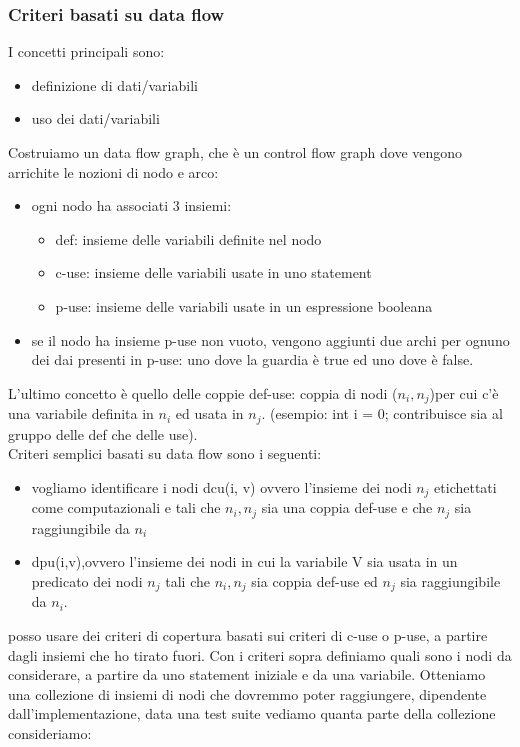 \documentclass{article}
\begin{document}
\subsubsection{Criteri basati su data flow}
I concetti principali sono:
\begin{itemize}
\item definizione di dati/variabili
\item uso dei dati/variabili
\end{itemize}
Costruiamo un data flow graph, che è un control flow graph dove vengono arrichite le nozioni di nodo e arco:
\begin{itemize}
\item ogni nodo ha associati 3 insiemi: 
\begin{itemize}
\item def: insieme delle variabili definite nel nodo
\item c-use: insieme delle variabili usate in uno statement
\item p-use: insieme delle variabili usate in un espressione booleana 
\end{itemize}
\item se il nodo ha insieme p-use non vuoto, vengono aggiunti due archi per ognuno dei dai presenti in p-use: uno dove la guardia è true ed uno dove è false.
\end{itemize}
L'ultimo concetto è quello delle coppie def-use: coppia di nodi ($n_i, n_j$)per cui c'è una variabile definita in $n_i$ ed usata in $n_j$. (esempio: int i = 0; contribuisce sia al gruppo delle def che delle use).\\ Criteri semplici basati su data flow sono i seguenti:
\begin{itemize}
\item vogliamo identificare i nodi dcu(i, v) ovvero l'insieme dei nodi $n_j$ etichettati come computazionali e tali che $n_i, n_j$ sia una coppia def-use e che $n_j$ sia raggiungibile da $n_i$
\item dpu(i,v),ovvero l'insieme dei nodi in cui la variabile V sia usata in un predicato dei nodi $n_j$ tali che $n_i, n_j$ sia coppia def-use ed $n_j$ sia raggiungibile da $n_i$.
\end{itemize}
posso usare dei criteri di copertura basati sui criteri di c-use o p-use, a partire dagli insiemi che ho tirato fuori. Con i criteri sopra definiamo quali sono i nodi da considerare, a partire da uno statement iniziale e da una variabile. Otteniamo una collezione di insiemi di nodi che dovremmo poter raggiungere, dipendente dall'implementazione, data una test suite vediamo quanta parte della collezione consideriamo:
\end{document}
